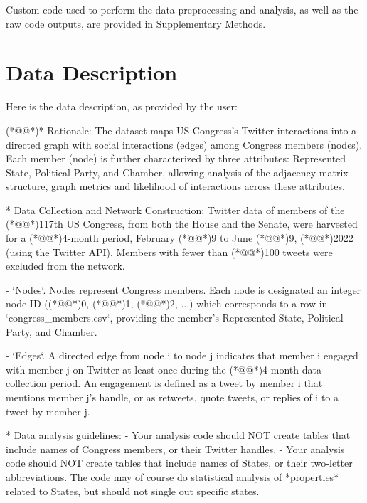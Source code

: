 \documentclass[11pt]{article}
\begin{document}
Custom code used to perform the data preprocessing and analysis, as well as the raw code outputs, are provided in Supplementary Methods.






\clearpage
\appendix

\section{Data Description} \label{sec:data_description} Here is the data description, as provided by the user:

\begin{codeoutput}
(*@@*)* Rationale:
The dataset maps US Congress's Twitter interactions into a directed graph with social interactions (edges) among Congress members (nodes). Each member (node) is further characterized by three attributes: Represented State, Political Party, and Chamber, allowing analysis of the adjacency matrix structure, graph metrics and likelihood of interactions across these attributes.

* Data Collection and Network Construction:
Twitter data of members of the (*@@*)117th US Congress, from both the House and the Senate, were harvested for a (*@@*)4-month period, February (*@@*)9 to June (*@@*)9, (*@@*)2022 (using the Twitter API). Members with fewer than (*@@*)100 tweets were excluded from the network.

- `Nodes`. Nodes represent Congress members. Each node is designated an integer node ID ((*@@*)0, (*@@*)1, (*@@*)2, ...) which corresponds to a row in `congress_members.csv`, providing the member's Represented State, Political Party, and Chamber.

- `Edges`. A directed edge from node i to node j indicates that member i engaged with member j on Twitter at least once during the (*@@*)4-month data-collection period. An engagement is defined as a tweet by member i that mentions member j's handle, or as retweets, quote tweets, or replies of i to a tweet by member j.


* Data analysis guidelines:
- Your analysis code should NOT create tables that include names of Congress members, or their Twitter handles.
- Your analysis code should NOT create tables that include names of States, or their two-letter abbreviations. The code may of course do statistical analysis of *properties* related to States, but should not single out specific states.



\end{codeoutput}
\end{document}

